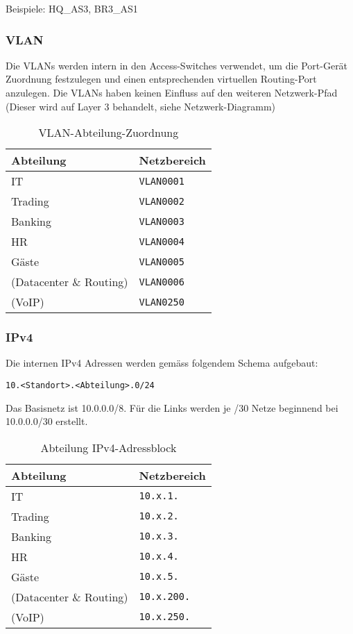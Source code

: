 Beispiele: HQ\_AS3, BR3\_AS1

\subsubsection{VLAN}
Die VLANs werden intern in den Access-Switches verwendet, um die Port-Gerät Zuordnung festzulegen und einen entsprechenden virtuellen Routing-Port anzulegen. Die VLANs haben keinen Einfluss auf den weiteren Netzwerk-Pfad (Dieser wird auf Layer 3 behandelt, siehe Netzwerk-Diagramm)

\begin{table}[h]
	\centering
	\begin{tabu}{l l}
		\toprule
		Abteilung & Netzbereich \\
		\midrule
		IT & \lstinline|VLAN0001|\\
		Trading & \lstinline|VLAN0002| \\
		Banking & \lstinline|VLAN0003|\\
		HR & \lstinline|VLAN0004|\\
		Gäste & \lstinline|VLAN0005|\\
		(Datacenter \& Routing) & \lstinline|VLAN0006|\\
		(VoIP) & \lstinline|VLAN0250|\\
		\bottomrule
	\end{tabu}
	\label{tbl:vlans}
	\caption{VLAN-Abteilung-Zuordnung}
\end{table}


\subsubsection{IPv4}
Die internen IPv4 Adressen werden gemäss folgendem Schema aufgebaut: 

 \lstinline|10.<Standort>.<Abteilung>.0/24|
 
 Das Basisnetz ist 10.0.0.0/8. Für die Links werden je /30 Netze beginnend bei 10.0.0.0/30 erstellt.
 
\begin{table}[h]
	\centering
  \begin{tabu}{l l}
  	\toprule
  	Abteilung & Netzbereich \\
  	\midrule
  	IT & \lstinline|10.x.1.|\\
  	Trading & \lstinline|10.x.2.| \\
  	Banking & \lstinline|10.x.3.|\\
  	HR & \lstinline|10.x.4.|\\
 	Gäste & \lstinline|10.x.5.|\\
 	(Datacenter \& Routing) & \lstinline|10.x.200.|\\
 	(VoIP) & \lstinline|10.x.250.|\\
 	\bottomrule
  \end{tabu}
  \label{tbl:abteilung_ipv4_adressblock}
  \caption{Abteilung IPv4-Adressblock}
\end{table}

